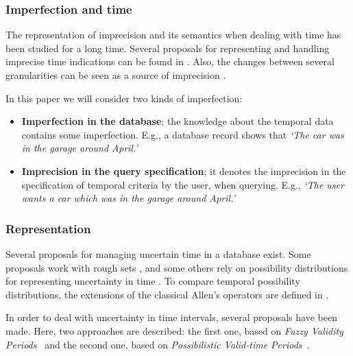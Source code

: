 \subsubsection{Imperfection and time}
The representation of imprecision and its semantics when dealing with time has been studied for a long time. Several proposals for representing and handling imprecise time indications can be found in \cite{DeCaluwe1997,DeTre1997}. Also, the changes between several granularities can be seen as a source of imprecision \cite{Devos1998}.

In this paper we will consider two kinds of imperfection:
\begin{itemize}
\item \textbf{Imperfection in the database}; the knowledge about the temporal data contains some imperfection. E.g., a database record shows that \emph{`The car was in the garage around April.'}
 \item \textbf{Imprecision in the query specification}; it denotes the imprecision in the specification of temporal criteria by the user, when querying. E.g., \emph{`The user wants a car which was in the garage around April.'}
\end{itemize}

\subsubsection{Representation}
Several proposals for managing uncertain time in a database exist. Some proposals work with rough sets \cite{Qiang2009}, and some others rely on possibility distributions for representing uncertainty in time \cite{Dyreson1998,Garrido2009,Galindo2001}. To compare temporal possibility distributions, the extensions of the classical Allen's operators \cite{Allen1983} are defined in \cite{Ohlbach2004,Nagypal2003,Dubois2003a,Schockaert2008}.



In order to deal with uncertainty in time intervals, several proposals have been made. Here, two approaches are described: the first one, based on \emph{Fuzzy Validity Periods}~\cite{Garrido2009} and the second one, based on \emph{Possibilistic Valid-time Periods}~\cite{JoseEnriquePons2012}.

